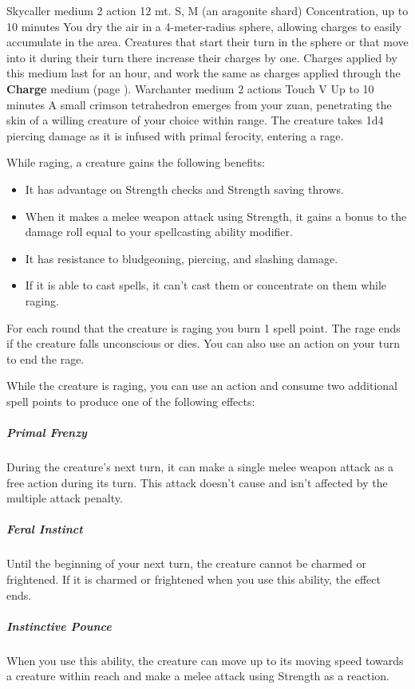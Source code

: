     {Skycaller medium}
    {2 action}
    {12 mt.}
    {S, M (an aragonite shard)}
    {Concentration, up to 10 minutes}
    You dry the air in a 4-meter-radius sphere, allowing charges to easily accumulate in the area.
    Creatures that start their turn in the sphere or that move into it during their turn there increase their charges by one.
    Charges applied by this medium last for an hour, and work the same as charges applied through the \textbf{Charge} medium (page \pageref{medium::charge}).
    {Warchanter medium}
    {2 actions}
    {Touch}
    {V}
    {Up to 10 minutes}
    A small crimson tetrahedron emerges from your zuan, penetrating the skin of a willing creature of your choice within range.
    The creature takes 1d4 piercing damage as it is infused with primal ferocity, entering a rage.

    While raging, a creature gains the following benefits:
    \begin{itemize}
        \item It has advantage on Strength checks and Strength saving throws.
        \item When it makes a melee weapon attack using Strength, it gains a bonus to the damage roll equal to your spellcasting ability modifier.
        \item It has resistance to bludgeoning, piercing, and slashing damage.
        \item If it is able to cast spells, it can't cast them or concentrate on them while raging.
    \end{itemize}

    For each round that the creature is raging you burn 1 spell point.
    The rage ends if the creature falls unconscious or dies.
    You can also use an action on your turn to end the rage.

    While the creature is raging, you can use an action and consume two additional spell points to produce one of the following effects:
    \subparagraph{Primal Frenzy}
    During the creature's next turn, it can make a single melee weapon attack as a free action during its turn.
    This attack doesn't cause and isn't affected by the multiple attack penalty.
    \subparagraph{Feral Instinct}
    Until the beginning of your next turn, the creature cannot be charmed or frightened.
    If it is charmed or frightened when you use this ability, the effect ends.
    \subparagraph{Instinctive Pounce}
    When you use this ability, the creature can move up to its moving speed towards a creature within reach and make a melee attack using Strength as a reaction.


